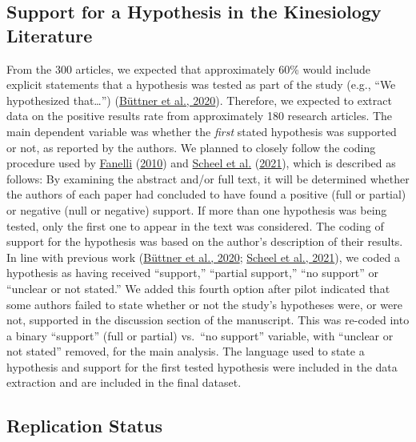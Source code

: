 \documentclass[]{cik}%
\begin{document}
\hypertarget{support-for-a-hypothesis-in-the-kinesiology-literature}{%
\subsection{Support for a Hypothesis in the Kinesiology
Literature}\label{support-for-a-hypothesis-in-the-kinesiology-literature}}

From the 300 articles, we expected that approximately 60\% would include
explicit statements that a hypothesis was tested as part of the study
(e.g., ``We hypothesized that\ldots{}'')
(\protect\hyperlink{ref-buttner_2020}{Büttner et al., 2020}). Therefore,
we expected to extract data on the positive results rate from
approximately 180 research articles. The main dependent variable was
whether the \emph{first} stated hypothesis was supported or not, as
reported by the authors. We planned to closely follow the coding
procedure used by \protect\hyperlink{ref-fanelli_positive_2010}{Fanelli}
(\protect\hyperlink{ref-fanelli_positive_2010}{2010}) and
\protect\hyperlink{ref-scheel_excess_2020}{Scheel et al.}
(\protect\hyperlink{ref-scheel_excess_2020}{2021}), which is described
as follows: By examining the abstract and/or full text, it will be
determined whether the authors of each paper had concluded to have found
a positive (full or partial) or negative (null or negative) support. If
more than one hypothesis was being tested, only the first one to appear
in the text was considered. The coding of support for the hypothesis was
based on the author's description of their results. In line with
previous work (\protect\hyperlink{ref-buttner_2020}{Büttner et al.,
2020}; \protect\hyperlink{ref-scheel_excess_2020}{Scheel et al., 2021}),
we coded a hypothesis as having received ``support,'' ``partial
support,'' ``no support'' or ``unclear or not stated.'' We added this
fourth option after pilot indicated that some authors failed to state
whether or not the study's hypotheses were, or were not, supported in
the discussion section of the manuscript. This was re-coded into a
binary ``support'' (full or partial) vs.~``no support'' variable, with
``unclear or not stated'' removed, for the main analysis. The language
used to state a hypothesis and support for the first tested hypothesis
were included in the data extraction and are included in the final
dataset.

\hypertarget{replication-status}{%
\subsection{Replication Status}\label{replication-status}}
\end{document}
